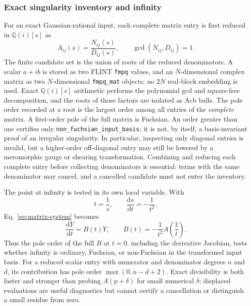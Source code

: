 \documentclass[11pt]{article}
\newcommand{\dd}{\mathrm d}
\begin{document}
\subsubsection{Exact singularity inventory and infinity}
\label{subsec:singularity-inventory}

For an exact Gaussian-rational input, each complete matrix entry is first reduced in
$\mathbb Q(i)[s]$ as
\begin{equation}
 A_{ij}(s)=\frac{N_{ij}(s)}{D_{ij}(s)},
 \qquad \gcd(N_{ij},D_{ij})=1.
\end{equation}
The finite candidate set is the union of roots of the reduced denominators.  A scalar
$a+ib$ is stored as two FLINT \texttt{fmpq} values, and an $N$-dimensional complex matrix as
two $N$-dimensional \texttt{fmpq\_mat} objects; no $2N$ real-block embedding is used.  Exact
$\mathbb Q(i)[s]$ arithmetic performs the polynomial gcd and square-free decomposition, and
the roots of those factors are isolated as Acb balls.  The pole order recorded at a root is
the largest order among all entries of the \emph{complete} matrix.  A first-order pole of the
full matrix is Fuchsian.  An order greater than one certifies only
\texttt{non\_fuchsian\_input\_basis}; it is not, by itself, a basis-invariant proof of an
irregular singularity.  In particular, inspecting only diagonal entries is invalid, but a
higher-order off-diagonal entry may still be lowered by a meromorphic gauge or shearing
transformation.  Combining and reducing each complete entry before collecting denominators
is essential: terms with the same denominator may cancel, and a cancelled candidate must
not enter the inventory.

The point at infinity is tested in its own local variable.  With
\begin{equation}
 t=\frac{1}{s},\qquad \frac{\dd s}{\dd t}=-\frac{1}{t^2},
\end{equation}
Eq.~\eqref{eq:matrix-system} becomes
\begin{equation}
 \frac{\dd Y}{\dd t}=B(t)Y,
 \qquad B(t)=-\frac{1}{t^2}A\!\left(\frac{1}{t}\right).
 \label{eq:infinity-transform}
\end{equation}
Thus the pole order of the full $B$ at $t=0$, including the derivative Jacobian, tests
whether infinity is ordinary, Fuchsian, or non-Fuchsian in the transformed input basis.
For a reduced scalar entry with numerator and denominator degrees $n$ and $d$, its
contribution has pole order $\max(0,n-d+2)$.  Exact divisibility is both faster and stronger
than probing $A(p+\delta)$ for small numerical $\delta$; displaced evaluations are useful
diagnostics but cannot certify a cancellation or distinguish a small residue from zero.
\end{document}

